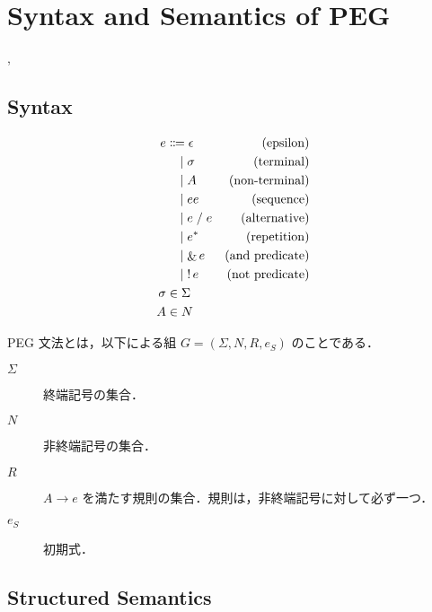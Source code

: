 \section{Syntax and Semantics of PEG}

\cite{Ford:2002}, \cite{Ford:2004}

\subsection{Syntax}

\begin{align*}
  e
  &\Coloneqq \epsilon &(\text{epsilon}) \\
  &\BNFor \sigma &(\text{terminal}) \\
  &\BNFor A &(\text{non-terminal}) \\
  &\BNFor ee &(\text{sequence}) \\
  &\BNFor e \mathrel{/} e &(\text{alternative}) \\
  &\BNFor e^* &(\text{repetition}) \\
  &\BNFor \mathop{\&} e &(\text{and predicate}) \\
  &\BNFor \mathop{!} e &(\text{not predicate}) \\
  \sigma &\in \Sigma \\
  A &\in N
\end{align*}

\begin{definition}
  PEG 文法とは，以下による組 $G = (\Sigma, N, R, e_S)$ のことである．
  \begin{description}
    \item[$\Sigma$] 終端記号の集合．
    \item[$N$] 非終端記号の集合．
    \item[$R$] $A \to e$ を満たす規則の集合．規則は，非終端記号に対して必ず一つ．
    \item[$e_S$] 初期式．
  \end{description}
\end{definition}

\subsection{Structured Semantics}

